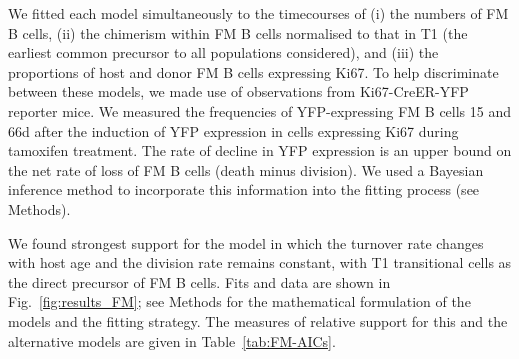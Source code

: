 \documentclass[12pt]{article}
\newcommand{\red}[1]{{\color{red}{#1}}}
\begin{document}




	
We fitted each model  simultaneously to the timecourses of (i) the numbers of FM B cells, (ii) the chimerism within FM B cells normalised to that in T1 (the earliest common precursor to all populations considered), and (iii) the proportions of host and donor FM B cells expressing Ki67. To help discriminate between these models, we made use of observations from  Ki67-CreER-YFP reporter mice.  We measured  the frequencies of YFP-expressing FM B cells   15 and 66d after the  induction of YFP expression in cells expressing Ki67 during tamoxifen treatment\red{(Figure)}.  The rate of decline in YFP expression  is an upper bound on the net rate of loss of FM B cells (death minus division). We used a Bayesian inference method to incorporate this information into the fitting process (see Methods). 
\red{I feel like this needs a bit more clarification}

We found strongest support for the model in which the turnover rate  changes with host age and the division rate remains constant, with T1 transitional cells as the direct precursor of FM B cells.  Fits and data are shown in Fig.~\ref{fig:results_FM}; see Methods for the mathematical formulation of the models and the fitting strategy.  The measures of relative support for this and the alternative models are given in Table~\ref{tab:FM-AICs}.

\end{document}
